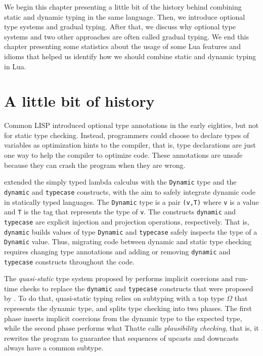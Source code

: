 We begin this chapter presenting a little bit of the history behind
combining static and dynamic typing in the same language.
Then, we introduce optional type systems and gradual typing.
After that, we discuss why optional type systems and two
other approaches are often called gradual typing.
We end this chapter presenting some statistics about the usage of
some Lua features and idioms that helped us identify how we should
combine static and dynamic typing in Lua.

\section{A little bit of history}
\label{sec:history}

Common LISP \citep{steele1982ocl} introduced optional type annotations
in the early eighties, but not for static type checking.
Instead, programmers could choose to declare types of variables as
optimization hints to the compiler, that is, type declarations are
just one way to help the compiler to optimize code.
These annotations are unsafe because they can crash the program
when they are wrong.

\citet{abadi1989dts} extended the simply typed lambda calculus with the
\texttt{Dynamic} type and the \texttt{dynamic} and \texttt{typecase}
constructs, with the aim to safely integrate dynamic code in
statically typed languages.
The \texttt{Dynamic} type is a pair \texttt{(v,T)} where \texttt{v} is a
value and \texttt{T} is the tag that represents the type of \texttt{v}.
The constructs \texttt{dynamic} and \texttt{typecase} are explicit
injection and projection operations, respectively.
That is, \texttt{dynamic} builds values of type \texttt{Dynamic} and
\texttt{typecase} safely inspects the type of a \texttt{Dynamic} value.
Thus, migrating code between dynamic and static type checking requires
changing type annotations and adding or removing \texttt{dynamic} and
\texttt{typecase} constructs throughout the code.

The \emph{quasi-static} type system proposed by \citet{thatte1990qst}
performs implicit coercions and run-time checks to replace the
\texttt{dynamic} and \texttt{typecase} constructs that were proposed by
\citet{abadi1989dts}.
To do that, quasi-static typing relies on subtyping with a top type
$\Omega$ that represents the dynamic type, and splits type checking
into two phases.
The first phase inserts implicit coercions from the dynamic type to
the expected type, while the second phase performs what Thatte calls
\emph{plausibility checking}, that is, it rewrites the program to
guarantee that sequences of upcasts and downcasts always have a
common subtype.

